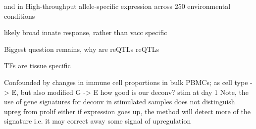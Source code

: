 and in High-throughput allele-specific expression across 250 environmental conditions

%


likely broad innate response, rather than vacc specific


Biggest question remains, why are reQTLs reQTLs

TFs are tissue specific

Confounded by changes in immune cell proportions in bulk PBMCs;
as cell type -> E, but also modified G -> E
how good is our deconv? stim at day 1
Note, the use of gene signatures for deconv
    in stimulated samples
    does not distinguish upreg from prolif either
    if expression goes up, the method will detect more of the signature
    i.e. it may correct away some signal of upregulation

